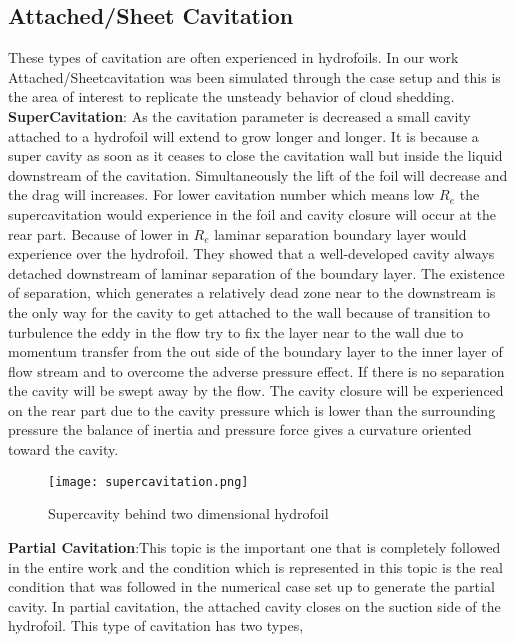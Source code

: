 \subsection{Attached/Sheet Cavitation}
These types of cavitation are often experienced in hydrofoils. In our work Attached/Sheetcavitation was been simulated through the case setup and this is the area of interest to replicate the unsteady behavior of cloud shedding.\\
\textbf{SuperCavitation}: As the cavitation parameter is decreased a small cavity attached to a hydrofoil will extend to grow longer and longer. It is because a super cavity as soon as it ceases to close the cavitation
wall but inside the liquid downstream of the cavitation. Simultaneously the lift of the foil will decrease and the drag will increases. For lower cavitation number which means low $R_e$ the supercavitation 
would experience in the foil and cavity closure will occur at the rear part. Because of lower in $R_e$ laminar separation boundary layer would experience over the hydrofoil. They showed that a well-developed 
cavity always detached downstream of laminar separation of the boundary layer. The existence of separation, which generates a relatively dead zone near to the downstream is the only way for the cavity to get attached to the wall because 
of transition to turbulence the eddy in the flow try to fix the layer near to the wall due to momentum transfer from the out side of the boundary layer to the inner layer of  flow stream and to overcome the adverse pressure effect. If there is no separation the cavity 
will be swept away by the flow. The cavity closure will be experienced on the rear part due to the cavity pressure which is lower than the surrounding pressure the balance of inertia and pressure force gives a 
curvature oriented toward the cavity.\\
\begin{figure}[H]
 \centering
 \texttt{[image: supercavitation.png]}
 \caption{Supercavity behind two dimensional hydrofoil}
  \label{fig:fig11}
\end{figure}

\textbf{Partial Cavitation}:This topic is the important one that is completely followed in the entire work and the condition which is represented in this topic is the real condition that was followed in the numerical
 case set up to generate the partial cavity. In partial cavitation, the attached cavity closes on the suction side of the hydrofoil. This type of cavitation has two types,

